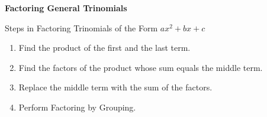 \begin{center}
\textbf{Factoring General Trinomials}
\end{center}

\vspace*{1ex}

Steps in Factoring Trinomials of the Form $ \displaystyle ax^{2} + bx + c$
\begin{enumerate}
\item Find the product of the first and the last term.
\item Find the factors of the product whose sum equals the  middle term.
\item Replace the middle term with the sum of the factors.
\item Perform Factoring by Grouping. 

\end{enumerate}

